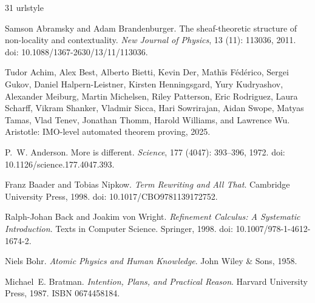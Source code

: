 \documentclass[11pt]{article}
\theoremstyle{definition}
\begin{document}
\begin{thebibliography}{31}
\providecommand{\natexlab}[1]{#1}
\providecommand{\url}[1]{\texttt{#1}}
\expandafter\ifx\csname urlstyle\endcsname\relax
  \providecommand{\doi}[1]{doi: #1}\else
  \providecommand{\doi}{doi: \begingroup \urlstyle{rm}\Url}\fi

Samson Abramsky and Adam Brandenburger.
\newblock The sheaf-theoretic structure of non-locality and contextuality.
\newblock \emph{New Journal of Physics}, 13 (11): 113036,
  2011.
\newblock \doi{10.1088/1367-2630/13/11/113036}.

Tudor Achim, Alex Best, Alberto Bietti, Kevin Der, Math{\"i}s F{\'e}d{\'e}rico,
  Sergei Gukov, Daniel Halpern-Leistner, Kirsten Henningsgard, Yury Kudryashov,
  Alexander Meiburg, Martin Michelsen, Riley Patterson, Eric Rodriguez, Laura
  Scharff, Vikram Shanker, Vladmir Sicca, Hari Sowrirajan, Aidan Swope, Matyas
  Tamas, Vlad Tenev, Jonathan Thomm, Harold Williams, and Lawrence Wu.
\newblock Aristotle: {IMO}-level automated theorem proving, 2025.

P.~W. Anderson.
\newblock More is different.
\newblock \emph{Science}, 177 (4047): 393--396, 1972.
\newblock \doi{10.1126/science.177.4047.393}.

Franz Baader and Tobias Nipkow.
\newblock \emph{Term Rewriting and All That}.
\newblock Cambridge University Press, 1998.
\newblock \doi{10.1017/CBO9781139172752}.

Ralph-Johan Back and Joakim von Wright.
\newblock \emph{Refinement Calculus: A Systematic Introduction}.
\newblock Texts in Computer Science. Springer, 1998.
\newblock \doi{10.1007/978-1-4612-1674-2}.

Niels Bohr.
\newblock \emph{Atomic Physics and Human Knowledge}.
\newblock John Wiley \& Sons, 1958.

Michael~E. Bratman.
\newblock \emph{Intention, Plans, and Practical Reason}.
\newblock Harvard University Press, 1987.
\newblock ISBN 0674458184.


\end{thebibliography}
\end{document}
